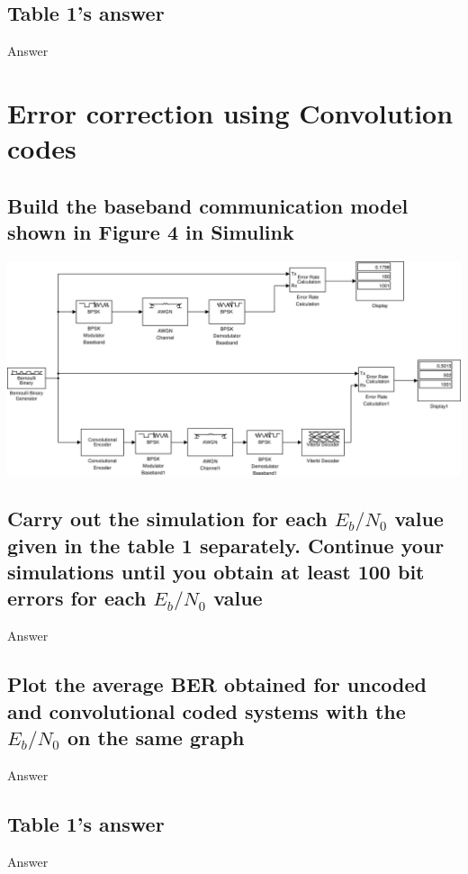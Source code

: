 \documentclass[11pt]{article}
\begin{document}
\subsection{Table 1's answer}
Answer


\section{Error correction using Convolution codes}
\subsection{Build the baseband communication model shown in Figure 4 in Simulink}
\begin{center}
\includegraphics[width=.7\textwidth]{images/q6-model.png}
\label{fig:q6-model}
\end{center}
\subsection{Carry out the simulation for each $E_b/N_0$ value given in the table 1 separately. Continue your
simulations until you obtain at least 100 bit errors for each $E_b/N_0$ value}
Answer
\subsection{Plot the average BER obtained for uncoded and convolutional coded systems with the
$E_b/N_0$ on the same graph}
Answer
\subsection{Table 1's answer}
Answer
\end{document}
